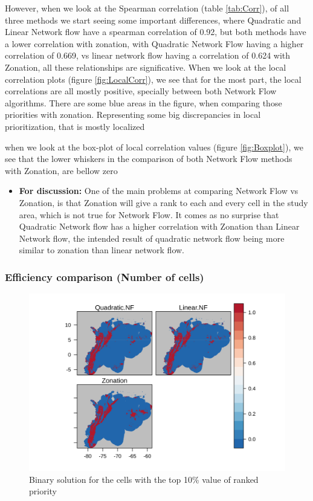 \documentclass[]{article}
\providecommand{\tightlist}{%
  \setlength{\itemsep}{0pt}\setlength{\parskip}{0pt}}
\begin{document}
However, when we look at the Spearman correlation (table \ref{tab:Corr}), of all three methods we start seeing some important differences, where Quadratic and Linear Network flow have a spearman correlation of 0.92, but both methods have a lower correlation with zonation, with Quadratic Network Flow having a higher correlation of 0.669, vs linear network flow having a correlation of 0.624 with Zonation, all these relationships are significative. When we look at the local correlation plots (figure \ref{fig:LocalCorr}), we see that for the most part, the local correlations are all mostly positive, specially between both Network Flow algorithms. There are some blue areas in the figure, when comparing those priorities with zonation. Representing some big discrepancies in local prioritization, that is mostly localized

when we look at the box-plot of local correlation values (figure \ref{fig:Boxplot}), we see that the lower whiskers in the comparison of both Network Flow methods with Zonation, are bellow zero

\begin{itemize}
\tightlist
\item
  \textbf{For discussion:} One of the main problems at comparing Network Flow vs Zonation, is that Zonation will give a rank to each and every cell in the study area, which is not true for Network Flow. It comes as no surprise that Quadratic Network flow has a higher correlation with Zonation than Linear Network flow, the intended result of quadratic network flow being more similar to zonation than linear network flow.
\end{itemize}

\hypertarget{efficiency-comparison-number-of-cells}{%
\subsubsection{Efficiency comparison (Number of cells)}\label{efficiency-comparison-number-of-cells}}

\begin{figure}
\centering
\includegraphics{NFPaper_files/figure-latex/Binary-1.png}
\caption{\label{fig:Binary}Binary solution for the cells with the top 10\% value of ranked priority}
\end{figure}
\end{document}
